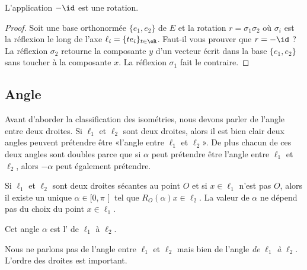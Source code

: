 \begin{lemma}       \label{LEMooMIJXooCjiQqP}
    L'application \( -\id\) est une rotation.
\end{lemma}

\begin{proof}
    Soit une base orthonormée \( \{ e_1,e_2 \}\) de \( E\) et la rotation \( r=\sigma_1\sigma_2\) où \( \sigma_i\) est la réflexion le long de l'axe \( \ell_i=\{ te_i \}_{t\in \eR}\). Faut-il vous prouver que \( r=-\id\) ? La réflexion \( \sigma_2\) retourne la composante \( y\) d'un vecteur écrit dans la base \( \{ e_1,e_2 \}\) sans toucher à la composante \( x\). La réflexion \( \sigma_1\) fait le contraire.
\end{proof}

\subsection{Angle}

Avant d'aborder la classification des isométries, nous devons parler de l'angle entre deux droites. Si \( \ell_1\) et \( \ell_2\) sont deux droites, alors il est bien clair deux angles peuvent prétendre être «l'angle entre \( \ell_1\) et \( \ell_2\)». De plus chacun de ces deux angles sont doubles parce que si \( \alpha\) peut prétendre être l'angle entre \( \ell_1\) et \( \ell_2\), alors \( -\alpha\) peut également prétendre.

\begin{lemmaDef}        \label{DEFooEGKOooRPGOAs}
    Si \( \ell_1\) et \( \ell_2\) sont deux droites sécantes au point \( O\) et si \( x\in\ell_1\) n'est pas \( O\), alors il existe un unique \( \alpha\in \mathopen[ 0 , \pi \mathclose[\) tel que \( R_O(\alpha)x\in \ell_2\). La valeur de \( \alpha\) ne dépend pas du choix du point \( x\in \ell_1\).

        Cet angle \( \alpha\) est l' de \( \ell_1\) à \( \ell_2\).
\end{lemmaDef}

\begin{remark}
    Nous ne parlons pas de l'angle entre \( \ell_1\) et \( \ell_2\) mais bien de l'angle \emph{de} \( \ell_1\) \emph{à} \( \ell_2\). L'ordre des droites est important.
\end{remark}

